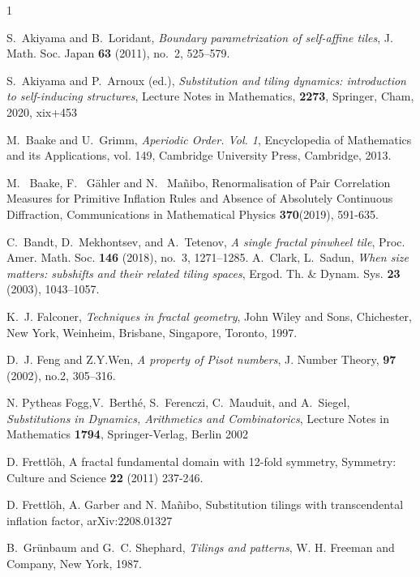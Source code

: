 \documentclass[a4]{amsart}
\theoremstyle{definition}
\begin{document}
\begin{thebibliography}{1}

S.~Akiyama and B.~Loridant, \emph{Boundary parametrization of self-affine
  tiles}, J. Math. Soc. Japan \textbf{63} (2011), no.~2, 525--579.

S.~Akiyama and P.~Arnoux (ed.),
\emph{{S}ubstitution and tiling dynamics: introduction to
              self-inducing structures},
Lecture Notes in Mathematics, \textbf{2273},
Springer, Cham, 2020, xix+453

M.~Baake and U.~Grimm, \emph{Aperiodic {O}rder. {V}ol. 1}, Encyclopedia of
  Mathematics and its Applications, vol. 149, Cambridge University Press,
  Cambridge, 2013.

M.~ Baake, F.~ G\"ahler and N.~ Ma\~nibo,
Renormalisation of Pair Correlation Measures for Primitive Inflation Rules
and Absence of Absolutely Continuous Diffraction,
Communications in Mathematical Physics \textbf{370}(2019), 591-635.

C.~Bandt, D.~Mekhontsev, and A.~Tetenov, \emph{A single fractal pinwheel tile},
  Proc. Amer. Math. Soc. \textbf{146} (2018), no.~3, 1271--1285.
A.~Clark, L.~Sadun,
\emph{When size matters: subshifts and their related tiling spaces},
Ergod. Th. \& Dynam. Sys. \textbf{23} (2003), 1043--1057.

K.~J. Falconer, \emph{Techniques in fractal geometry}, John Wiley and Sons,
  Chichester, New York, Weinheim, Brisbane, Singapore, Toronto, 1997.

D.~J. Feng and Z.Y.Wen, 
\emph{A property of Pisot numbers}, J. Number Theory, \textbf{97} (2002), no.2, 305--316.

 N. Pytheas Fogg,V.~Berthé, S.~Ferenczi, C.~Mauduit, and A.~Siegel,
\emph{Substitutions in {D}ynamics, {A}rithmetics and {C}ombinatorics}, Lecture Notes in Mathematics \textbf{1794}, Springer-Verlag, Berlin 2002

D. Frettl\"oh, 
A fractal fundamental domain with 12-fold symmetry, Symmetry: Culture and Science \textbf{22} (2011) 237-246.

D. Frettlöh, A. Garber and N. Ma\~nibo,
Substitution tilings with transcendental inflation factor,
arXiv:2208.01327

B.~Gr{\"u}nbaum and G.~C. Shephard, \emph{Tilings and patterns}, W. H. Freeman
  and Company, New York, 1987.


\end{thebibliography}
\end{document}
